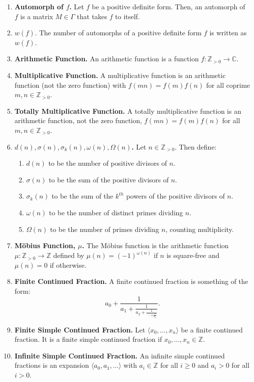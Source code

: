 \documentclass[12pt]{article}
\theoremstyle{definition}
\theoremstyle{named}
\begin{document}
\begin{enumerate}
    \item \textbf{Automorph of $f$. } Let $f$ be a positive definite form. Then, an automorph of $f$ is a matrix $M \in \Gamma$ that takes $f$ to itself. 
    \item \textbf{$w(f)$}. The number of automorphs of a positive definite form $f$ is written as $w(f)$. 
    \item \textbf{Arithmetic Function. } An arithmetic function is a function $f: \mathbb{Z}_{>0} \to \mathbb{C}$. 
    \item \textbf{Multiplicative Function. } A multiplicative function is an arithmetic function (not the zero function) with $f(mn) = f(m)f(n)$ for all coprime $m,n \in \mathbb{Z}_{>0}$. 
    \item \textbf{Totally Multiplicative Function. } A totally multiplicative function is an arithmetic function, not the zero function, $f(mn) = f(m)f(n)$ for all $m,n \in \mathbb{Z}_{>0}$. 
    \item \textbf{$d(n), \sigma(n), \sigma_k(n), \omega(n), \Omega(n)$. } Let $n \in \mathbb{Z}_{>0}$. Then define: 
    \begin{enumerate}
        \item $d(n)$ to be the number of positive divisors of $n$. 
        \item $\sigma(n)$ to be the sum of the positive divisors of $n$. 
        \item $\sigma_k(n)$ to be the sum of the $k^{th}$ powers of the positive divisors of $n$. 
        \item $\omega(n)$ to be the number of distinct primes dividing $n$. 
        \item $\Omega(n)$ to be the number of primes dividing $n$, counting multiplicity. 
    \end{enumerate}
    \item \textbf{Möbius Function, $\mu$. } The Möbius function is the arithmetic function $\mu: \mathbb{Z}_{>0} \to \mathbb{Z}$ defined by $\mu(n) = (-1)^{\omega(n)}$ if $n$ is square-free and $\mu(n) = 0$ if otherwise. 
    \item \textbf{Finite Continued Fraction. } A finite continued fraction is something of the form: 
    $$
    a_0 + \frac{1}{a_1 + \frac{1}{a_2 + \frac{1}{\ddots + \frac{1}{a_n}}}}. 
    $$
    \item \textbf{Finite Simple Continued Fraction. } Let $\langle x_0,\dots,x_n \rangle$ be a finite continued fraction. It is a finite simple continued fraction if $x_0,\dots,x_n \in \mathbb{Z}$. 
    \item \textbf{Infinite Simple Continued Fraction. } An infinite simple continued fractions is an expansion $\langle a_0,a_1,\dots \rangle$ with $a_i \in \mathbb{Z}$ for all $i \geq 0$ and $a_i > 0$ for all $i > 0$. 

\end{enumerate}
\end{document}
